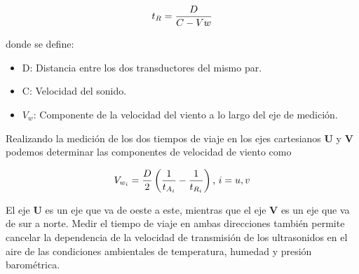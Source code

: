 \begin{equation}
  \centering
  t_{R} = \frac{D}{C - Vw}
  \label{eq:t_R}
\end{equation}

donde se define:
\begin{itemize}
  \item D: Distancia entre los dos transductores del mismo par.
  \item C: Velocidad del sonido.
  \item $V_{w}$: Componente de la velocidad del viento a lo largo del eje de medición.
\end{itemize}

Realizando la medición de los dos tiempos de viaje en los ejes cartesianos $\mathbf{U}$ y $\mathbf{V}$ podemos determinar las componentes de velocidad de viento como 


\begin{equation}
  \centering
  V_{w_{i}} = \frac{D}{2}\left(\frac{1}{t_{A_{i}}}-\frac{1}{t_{R_{i}}}\right)\text{,  } i= u,v
  \label{eq:velViento}
\end{equation}

El eje $\mathbf{U}$ es un eje que va de oeste a este, mientras que el eje $\mathbf{V}$ es un eje que va de sur a norte. Medir el tiempo de viaje en ambas direcciones también permite cancelar la dependencia de la velocidad de transmisión de los ultrasonidos en el aire de las condiciones ambientales de temperatura, humedad y presión barométrica.



